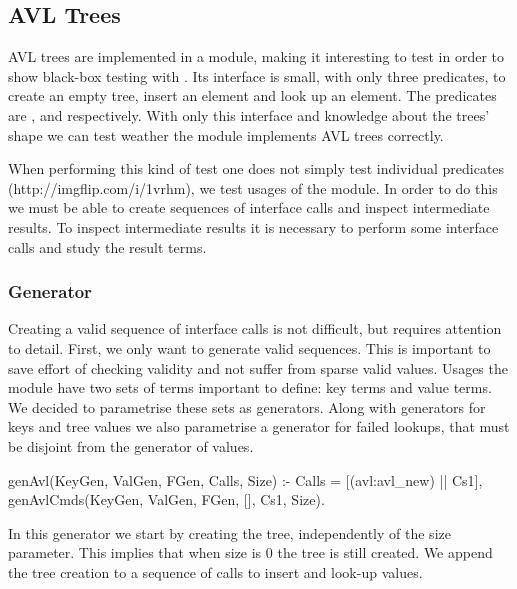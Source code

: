 \subsection{AVL Trees}
AVL trees are implemented in a \Yap{} module, making it interesting to
test in order to show black-box testing with \plqc{}.
%
Its interface is small, with only three predicates, to create an empty
tree, insert an element and look up an element.
%
The predicates are ,  and
 respectively.
%
With only this interface and knowledge about the trees' shape we can
test weather the module implements AVL trees correctly.


When performing this kind of test one does not simply test individual
predicates (http://imgflip.com/i/1vrhm), we test usages of the module.
%
In order to do this we must be able to create sequences of interface
calls and inspect intermediate results.
%
To inspect intermediate results it is necessary to perform some
interface calls and study the result terms.

\subsubsection*{Generator}

Creating a valid sequence of interface calls is not difficult, but
requires attention to detail.
%
First, we only want to generate valid sequences.
%
This is important to save effort of checking validity and not suffer
from sparse valid values.
%
Usages the module  have two sets of terms important to
define: key terms and value terms.
%
We decided to parametrise these sets as generators.
%
Along with generators for keys and tree values we also parametrise a
generator for failed lookups, that must be disjoint from the generator
of values.
\begin{yapcode}
 genAvl(KeyGen, ValGen, FGen, Calls, Size) :-
   Calls = [(avl:avl_new) || Cs1],
   genAvlCmds(KeyGen, ValGen, FGen,
              [], Cs1, Size).
\end{yapcode}
%
In this generator we start by creating the tree, independently of the
size parameter.
%
This implies that when size is 0 the tree is still created.
%
We append the tree creation to a sequence of calls to insert and look-up
values.



